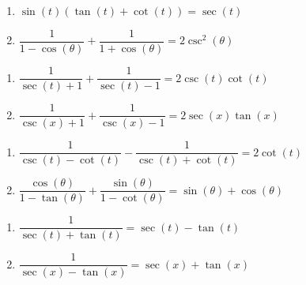 \begin{multicols}{2}

\begin{enumerate}

\setcounter{enumi}{\value{HW}}

\item $\sin(t)(\tan(t) + \cot(t)) = \sec(t)$ 
\item   $\dfrac{1}{1-\cos(\theta)} + \dfrac{1}{1+\cos(\theta)} = 2\csc^{2}(\theta)$

\setcounter{HW}{\value{enumi}}

\end{enumerate}

\end{multicols}

\begin{multicols}{2}

\begin{enumerate}

\setcounter{enumi}{\value{HW}}

\item  $\dfrac{1}{\sec(t) + 1} + \dfrac{1}{\sec(t)-1} = 2 \csc(t) \cot(t)$
\item  $\dfrac{1}{\csc(x) + 1} + \dfrac{1}{\csc(x)-1} = 2 \sec(x) \tan(x)$

\setcounter{HW}{\value{enumi}}

\end{enumerate}

\end{multicols}

\begin{multicols}{2}

\begin{enumerate}

\setcounter{enumi}{\value{HW}}
\small
\item $\dfrac{1}{\csc(t)-\cot(t)} - \dfrac{1}{\csc(t) + \cot(t)} = 2 \cot(t)$
\item $\dfrac{\cos(\theta)}{1 - \tan(\theta)} + \dfrac{\sin(\theta)}{1 - \cot(\theta)} = \sin(\theta) + \cos(\theta)$
\normalsize
\setcounter{HW}{\value{enumi}}

\end{enumerate}

\end{multicols}

\begin{multicols}{2}

\begin{enumerate}

\setcounter{enumi}{\value{HW}}

\item $\dfrac{1}{\sec(t) + \tan(t)} = \sec(t) - \tan(t)$
\item  $\dfrac{1}{\sec(x) - \tan(x)} = \sec(x) + \tan(x)$

\setcounter{HW}{\value{enumi}}

\end{enumerate}

\end{multicols}

